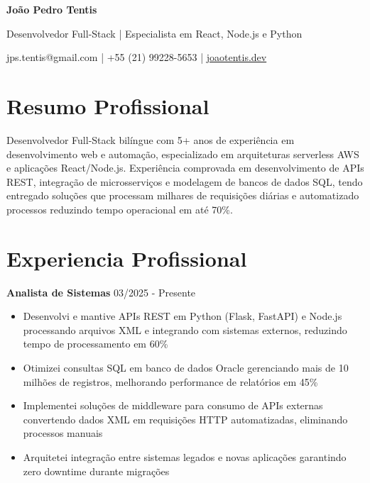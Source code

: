\documentclass[a4paper,11pt]{article}
\begin{document}
\begin{center}
{\LARGE\bfseries João Pedro Tentis}
\end{center}
\begin{center}
{\color{muted}\large Desenvolvedor Full-Stack | Especialista em React, Node.js e Python}
\end{center}
\begin{center}
{\color{muted}\small jps.tentis@gmail.com \enspace | \enspace +55 (21) 99228-5653} \enspace | \enspace \href{https://joaotentis.dev}{joaotentis.dev}
\end{center}
\vspace{0.2em}
\section*{Resumo Profissional}
Desenvolvedor Full-Stack bilíngue com 5+ anos de experiência em desenvolvimento web e automação, especializado em arquiteturas serverless AWS e aplicações React/Node.js. Experiência comprovada em desenvolvimento de APIs REST, integração de microsserviços e modelagem de bancos de dados SQL, tendo entregado soluções que processam milhares de requisições diárias e automatizado processos reduzindo tempo operacional em até 70\%.

\section*{Experiencia Profissional}
\vspace{0.3em}
\noindent\textbf{Analista de Sistemas} \hfill {\color{light}\small 03/2025 - Presente}

\begin{itemize}[leftmargin=1.5em, itemsep=1pt, parsep=0pt, topsep=2pt]
  \item Desenvolvi e mantive APIs REST em Python (Flask, FastAPI) e Node.js processando arquivos XML e integrando com sistemas externos, reduzindo tempo de processamento em 60\%
  \item Otimizei consultas SQL em banco de dados Oracle gerenciando mais de 10 milhões de registros, melhorando performance de relatórios em 45\%
  \item Implementei soluções de middleware para consumo de APIs externas convertendo dados XML em requisições HTTP automatizadas, eliminando processos manuais
  \item Arquitetei integração entre sistemas legados e novas aplicações garantindo zero downtime durante migrações
\end{itemize}
\end{document}
